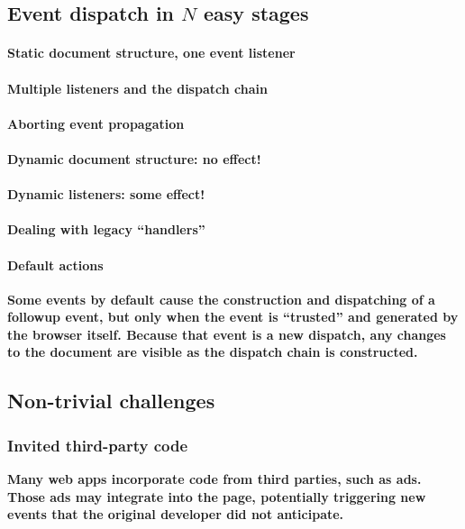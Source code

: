 \documentclass[letterpaper,10pt,twocolumn]{article}
\begin{document}
\subsection{Event dispatch in $N$ easy stages}
\paragraph{Static document structure, one event listener}
\lipsum[1-2]
\paragraph{Multiple listeners and the dispatch chain}
\lipsum[3]
\paragraph{Aborting event propagation}
\lipsum[4]
\paragraph{Dynamic document structure: no effect!}
\lipsum[5]
\paragraph{Dynamic listeners: some effect!}
\lipsum[6]
\paragraph{Dealing with legacy ``handlers''}
\lipsum[7]
\paragraph{Default actions}
\textbf{Some events by default cause the construction and dispatching
  of a followup event, but only when the event is ``trusted'' and
  generated by the browser itself.  Because that event is a new
  dispatch, any changes to the document are visible as the dispatch
  chain is constructed.}

\subsection{Non-trivial challenges}
\subsubsection{Invited third-party code}
\textbf{Many web apps incorporate code from third parties, such as
  ads.  Those ads may integrate into the page, potentially triggering
  new events that the original developer did not anticipate.}
\lipsum[1]
\end{document}
